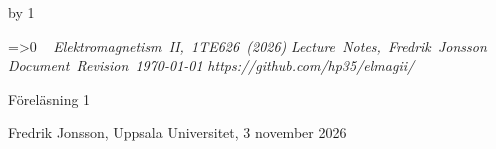 {\cleardoublepage
%
%
%
%
%
%
%
\def\coursename{Elektromagnetism II}
\def\coursecode{1TE626}
\def\courseyear{2026}
\def\courserepo{https://github.com/hp35/elmagii/}
\def\lecturenumber{1}
\def\lecturetitle{Elektrostatik, superpositionsprincipen och Gauss lag}
\def\lecturesubtitle{}
\def\lectureauthor{Fredrik Jonsson}
\def\lectureplace{Uppsala Universitet}
\def\lecturedate{3 november 2026}
\edef\expandedlecturenumber{1}
\def\ifempty#1{\ifx\relax#1\relax}
\advance\chapno by 1
\immediate{}
\hsize=150mm\hoffset=4.6mm\vsize=230mm\voffset=7mm
\topskip=0pt\baselineskip=12pt\parskip=0pt\leftskip=0pt\parindent=15pt
\ifcolors
  \voffset=-10.2mm\topskip=0pt
\fi
\headline={\ifnum\secno>0\ifodd\pageno\rightheadline\else\leftheadline\fi
  \else\hfill\fi}
\def\rightheadline{\tenrm{\it F\"orel\"asning 1}
  \hfil{\it \coursename, \coursecode\ (\courseyear)}}
\def\leftheadline{\tenrm{\it \coursename, \coursecode\ (\courseyear)}
  \hfil{\it F\"orel\"asning 1}}
\noindent~\vskip-60pt\hskip-40pt{}
\vskip-42pt\hfill\vbox{
    \hbox{{\it \coursename, \coursecode\ (\courseyear)}}
    \hbox{{\it Lecture Notes, \lectureauthor}}
    \hbox{{\it Document Revision \today}}
    \hbox{{\it \courserepo}}}\vskip 36pt
\centerline{\twelvesc F\"orel\"asning 1}
\vskip 24pt\noindent
\centerline{}
\expandafter\ifempty\expandafter{\lecturesubtitle}%
  \else\centerline{\twelvesc\lecturesubtitle}\fi
\bigskip
\centerline{\lectureauthor, \lectureplace, \lecturedate}
\vskip24pt



}
